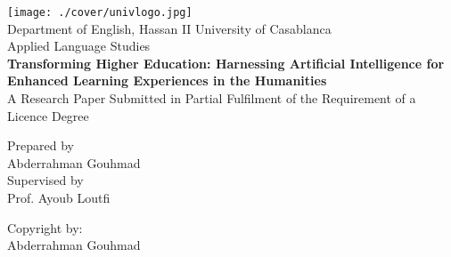 \begin{titlepage}
  \centering
  \texttt{[image: ./cover/univlogo.jpg]} \\
  \centering
  Department of English, Hassan II University of Casablanca \\
  Applied Language Studies \\
  \vspace*{2cm}
  \textbf{\huge Transforming Higher Education: Harnessing Artificial Intelligence for Enhanced Learning Experiences in the Humanities} \\
  \vspace*{2cm}
  A Research Paper Submitted in Partial Fulfilment of the Requirement of a Licence Degree \\
  \vspace*{4cm}

  \begin{center}
    Prepared by\\ Abderrahman
    Gouhmad\\ Supervised by \\
    Prof. Ayoub Loutfi \\
  \end{center}
  \newpage
  \thispagestyle{empty}
  \vspace*{20cm}
  Copyright by:\\
  Abderrahman Gouhmad \\
  \vspace*{\fill}
  \mydate
\end{titlepage}
